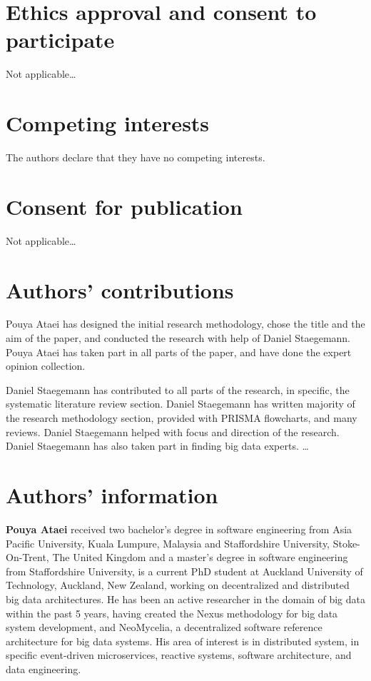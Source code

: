 \documentclass{bmcart}
\begin{document}
\begin{backmatter}
\section*{Ethics approval and consent to participate}%
Not applicable\ldots

\section*{Competing interests}
The authors declare that they have no competing interests.

\section*{Consent for publication}%
Not applicable\ldots

\section*{Authors' contributions}
Pouya Ataei has designed the initial research methodology, chose the title and the aim of the paper, and conducted the research with help of Daniel Staegemann. Pouya Ataei has taken part in all parts of the paper, and have done the expert opinion collection.


Daniel Staegemann has contributed to all parts of the research, in specific, the systematic literature review section. Daniel Staegemann has written majority of the research methodology section, provided with PRISMA flowcharts, and many reviews. Daniel Staegemann helped with focus and direction of the research. Daniel Staegemann has also taken part in finding big data experts. 
 \ldots

\section*{Authors' information}%
\textbf{Pouya Ataei} received two bachelor’s degree in
software engineering from Asia Pacific University,
Kuala Lumpure, Malaysia and Staffordshire University,
Stoke-On-Trent, The United Kingdom and
a master’s degree in software engineering from
Staffordshire University, is a current PhD student
at Auckland University of Technology, Auckland,
New Zealand, working on decentralized and distributed
big data architectures. He has been an
active researcher in the domain of big data within
the past 5 years, having created the Nexus methodology for big data system
development, and NeoMycelia, a decentralized software reference architecture
for big data systems. His area of interest is in distributed system, in
specific event-driven microservices, reactive systems, software architecture,
and data engineering.


\end{backmatter}
\end{document}
